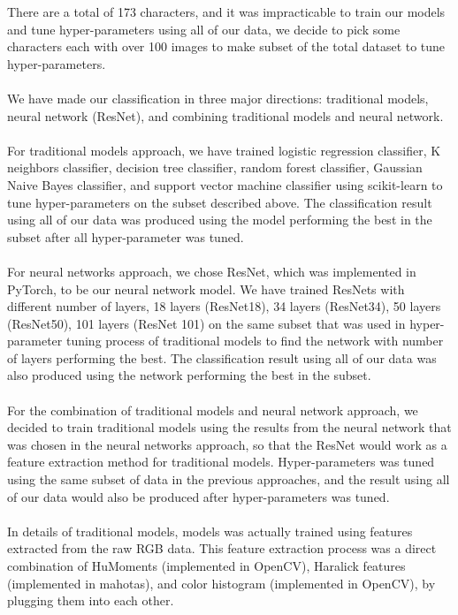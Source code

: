 \documentclass[11.5pt]{article}
\begin{document}
    There are a total of 173 characters, and it was impracticable to train our models and tune hyper-parameters using all of our data, we decide to pick some characters each with over 100 images to make subset of the total dataset to tune hyper-parameters.\\ \\
    We have made our classification in three major directions: traditional models, neural network (ResNet), and combining traditional models and neural network.\\ \\
    For traditional models approach, we have trained logistic regression classifier, K neighbors classifier, decision tree classifier, random forest classifier, Gaussian Naive Bayes classifier, and support vector machine classifier using scikit-learn to tune hyper-parameters on the subset described above.
    The classification result using all of our data was produced using the model performing the best in the subset after all hyper-parameter was tuned.\\ \\
    For neural networks approach, we chose ResNet, which was implemented in PyTorch, to be our neural network model.
    We have trained ResNets with different number of layers, 18 layers (ResNet18), 34 layers (ResNet34), 50 layers (ResNet50), 101 layers (ResNet 101) on the same subset that was used in hyper-parameter tuning process of traditional models to find the network with number of layers performing the best.
    The classification result using all of our data was also produced using the network performing the best in the subset.\\ \\
    For the combination of traditional models and neural network approach, we decided to train traditional models using the results from the neural network that was chosen in the neural networks approach, so that the ResNet would work as a feature extraction method for traditional models.
    Hyper-parameters was tuned using the same subset of data in the previous approaches, and the result using all of our data would also be produced after hyper-parameters was tuned.\\ \\
    In details of traditional models, models was actually trained using features extracted from the raw RGB data.
    This feature extraction process was a direct combination of HuMoments (implemented in OpenCV), Haralick features (implemented in mahotas), and color histogram (implemented in OpenCV), by plugging them into each other.
\end{document}

